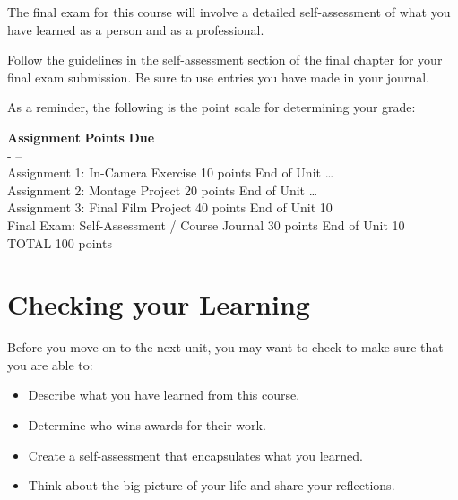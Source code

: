 \documentclass[
]{book}
\providecommand{\tightlist}{%
  \setlength{\itemsep}{0pt}\setlength{\parskip}{0pt}}
\begin{document}
\begin{assessment}
The final exam for this course will involve a detailed self-assessment of what you have learned as a person and as a professional.

Follow the guidelines in the self-assessment section of the final chapter for your final exam submission. Be sure to use entries you have made in your journal.

As a reminder, the following is the point scale for determining your grade:

\textbf{Assignment} \textbar{} \textbf{Points} \textbar{} \textbf{Due} \textbar{}\\
\hspace*{0.333em}\textbar{} - \textbar{} -- \textbar{}\\
Assignment 1: In-Camera Exercise \textbar{} 10 points \textbar{} End of Unit \ldots{} \textbar{}\\
Assignment 2: Montage Project \textbar{} 20 points \textbar{} End of Unit \ldots{} \textbar{}\\
Assignment 3: Final Film Project \textbar{} 40 points \textbar{} End of Unit 10 \textbar{}\\
Final Exam: Self-Assessment / Course Journal \textbar{} 30 points \textbar{} End of Unit 10 \textbar{}\\
TOTAL \textbar{} 100 points \textbar{} \textbar{}
\end{assessment}

\hypertarget{checking-your-learning-9}{%
\section*{Checking your Learning}\label{checking-your-learning-9}}

\begin{progress}
Before you move on to the next unit, you may want to check to make sure that you are able to:

\begin{itemize}
\tightlist
\item
  Describe what you have learned from this course.\\
\item
  Determine who wins awards for their work.\\
\item
  Create a self-assessment that encapsulates what you learned.\\
\item
  Think about the big picture of your life and share your reflections.
\end{itemize}
\end{progress}
\end{document}
